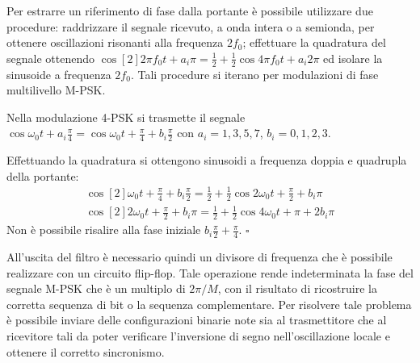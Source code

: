 Per estrarre un riferimento di fase dalla portante è possibile utilizzare due procedure: raddrizzare il segnale ricevuto, a onda intera o a semionda, per ottenere oscillazioni risonanti alla frequenza $2f_0$; effettuare la quadratura del segnale ottenendo $\cos[2]{2\pi f_0 t+a_i\pi}=\frac{1}{2}+\frac{1}{2}\cos{4\pi f_0 t+a_i 2\pi}$ ed isolare la sinusoide a frequenza $2f_0$. Tali procedure si iterano per modulazioni di fase multilivello M-\ac{PSK}.

\begin{esempio}
Nella modulazione 4-\ac{PSK} si trasmette il segnale $\cos{\omega_0 t+a_i\frac{\pi}{4}}=\cos{\omega_0 t+\frac{\pi}{4}+b_i\frac{\pi}{2}}$ con $a_i=1,3,5,7$, $b_i=0,1,2,3$.

Effettuando la quadratura si ottengono sinusoidi a frequenza doppia e quadrupla della portante:
\[\begin{split}\cos[2]{\omega_0 t+\frac{\pi}{4}+b_i\frac{\pi}{2}}=\frac{1}{2}+\frac{1}{2}\cos{2\omega_0 t+\frac{\pi}{2}+b_i\pi} \\ \cos[2]{2\omega_0 t+\frac{\pi}{2}+b_i\pi}=\frac{1}{2}+\frac{1}{2}\cos{4\omega_0 t+\pi+2b_i\pi}\end{split}\]
Non è possibile risalire alla fase iniziale $b_i\frac{\pi}{2}+\frac{\pi}{4}$. $\square$
\end{esempio}

All'uscita del filtro è necessario quindi un divisore di frequenza che è possibile realizzare con un circuito flip-flop. Tale operazione rende indeterminata la fase del segnale M-\ac{PSK} che è un multiplo di $2\pi/M$, con il risultato di ricostruire la corretta sequenza di bit o la sequenza complementare. Per risolvere tale problema è possibile inviare delle configurazioni binarie note sia al trasmettitore che al ricevitore tali da poter verificare l'inversione di segno  nell'oscillazione locale e ottenere il corretto sincronismo.

